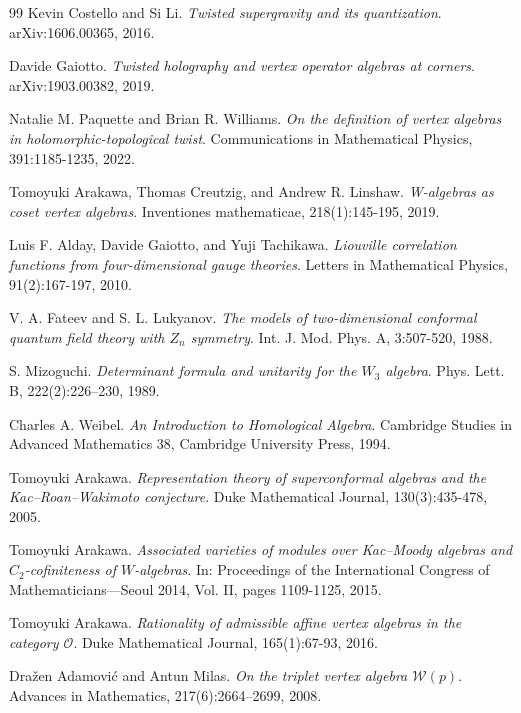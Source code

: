 \begin{thebibliography}{99}
Kevin Costello and Si Li.
\textit{Twisted supergravity and its quantization}.
arXiv:1606.00365, 2016.

Davide Gaiotto.
\textit{Twisted holography and vertex operator algebras at corners}.
arXiv:1903.00382, 2019.

Natalie M. Paquette and Brian R. Williams.
\textit{On the definition of vertex algebras in holomorphic-topological twist}.
Communications in Mathematical Physics, 391:1185-1235, 2022.

Tomoyuki Arakawa, Thomas Creutzig, and Andrew R. Linshaw.
\textit{W-algebras as coset vertex algebras}.
Inventiones mathematicae, 218(1):145-195, 2019.

Luis F. Alday, Davide Gaiotto, and Yuji Tachikawa.
\textit{Liouville correlation functions from four-dimensional gauge theories}.
Letters in Mathematical Physics, 91(2):167-197, 2010.

V. A. Fateev and S. L. Lukyanov.
\textit{The models of two-dimensional conformal quantum field theory with $Z_n$ symmetry}.
Int. J. Mod. Phys. A, 3:507-520, 1988.

S. Mizoguchi.
\textit{Determinant formula and unitarity for the $W_3$ algebra}.
Phys. Lett. B, 222(2):226--230, 1989.

Charles A. Weibel.
\textit{An Introduction to Homological Algebra}.
Cambridge Studies in Advanced Mathematics 38, Cambridge University Press, 1994.


Tomoyuki Arakawa.
\textit{Representation theory of superconformal algebras and the Kac--Roan--Wakimoto conjecture}.
Duke Mathematical Journal, 130(3):435-478, 2005.

Tomoyuki Arakawa.
\textit{Associated varieties of modules over Kac--Moody algebras and $C_2$-cofiniteness of $W$-algebras}.
In: Proceedings of the International Congress of Mathematicians---Seoul 2014, Vol. II, pages 1109-1125, 2015.

Tomoyuki Arakawa.
\textit{Rationality of admissible affine vertex algebras in the category $\mathcal{O}$}.
Duke Mathematical Journal, 165(1):67-93, 2016.

Dra\v{z}en Adamovi\'c and Antun Milas.
\textit{On the triplet vertex algebra $\mathcal{W}(p)$}.
Advances in Mathematics, 217(6):2664--2699, 2008.


\end{thebibliography}
